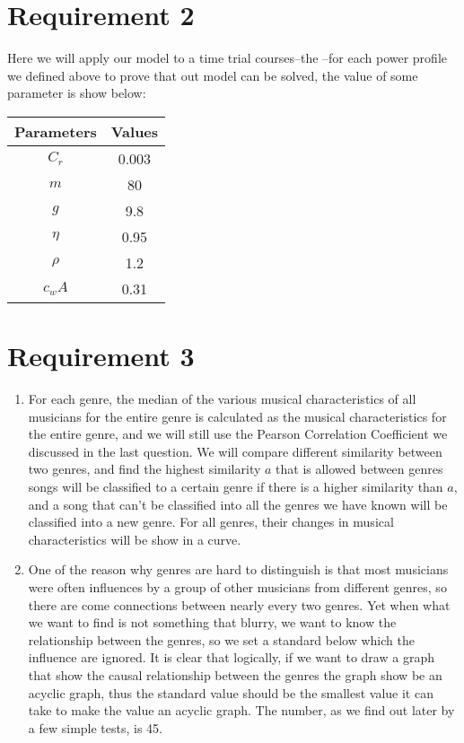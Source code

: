 \documentclass[12pt]{article}
\begin{document}
\section{Requirement 2}
Here we will apply our model to a time trial courses--the --for each power profile we defined above to prove that out model can be solved,
the value of some parameter is show below:
\begin{tabular}{|c |c|}\hline
    \bf Parameters & \bf Values \\\hline
    $C_r$          & 0.003      \\\hline
    $m$            & 80         \\\hline
    $g$            & 9.8        \\\hline
    $\eta $        & 0.95       \\\hline
    $\rho  $       & 1.2        \\\hline
    $c_wA$         & 0.31       \\\hline
\end{tabular}
\section{Requirement 3}
\begin{enumerate}
    \item For each genre, the median of the various musical characteristics of all musicians for the entire genre is calculated as the musical characteristics
          for the entire genre, and we will still use the Pearson Correlation Coefficient we discussed in the last question. We will compare different similarity between two
          genres, and find the highest similarity $a$ that is allowed between genres songs will be classified to a certain genre if there is a higher similarity than $a$, and a song
          that can't be classified into all the genres we have known will be classified into a new genre. For all genres, their changes in musical characteristics will be show in
          a curve.

    \item One of the reason why genres are hard to distinguish is that most musicians were often influences by a group of other musicians from different genres, so there are
          come connections between nearly every two genres. Yet when what we want to find is not something that blurry, we want to know the relationship between the genres,
          so we set a standard below which the influence are ignored. It is clear that logically, if we want to draw a graph that show the causal relationship between the genres
          the graph show be an acyclic graph, thus the standard value should be the smallest value it can take to make the value an acyclic graph. The number, as we find out later
          by a few simple tests, is 45.
\end{enumerate}
\end{document}
